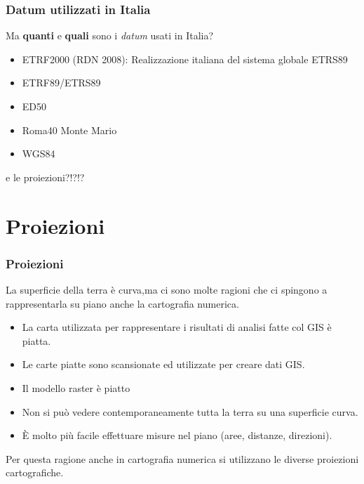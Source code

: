 \documentclass{beamer}
\begin{document}
{\begin{frame}
\end{frame}

\begin{frame}
\frametitle{Datum utilizzati in Italia}

Ma \textbf{quanti} e \textbf{quali} sono i \textit{datum} usati in Italia?

\begin{itemize}
	\item ETRF2000 (RDN 2008): Realizzazione italiana del sistema globale ETRS89
	\item ETRF89/ETRS89	
	\item ED50	 
	\item Roma40 Monte Mario
	\item WGS84
\end{itemize}

\begin{center}
e le proiezioni?!?!?
\end{center}
\end{frame}

\section{Proiezioni}

\begin{frame}
   \frametitle{Proiezioni}
	La superficie della terra è curva,ma ci sono molte ragioni che ci spingono a
    rappresentarla su piano anche la cartografia numerica.
	\begin{itemize}
		\item La carta utilizzata per rappresentare i risultati di analisi fatte col GIS è piatta.
		\item Le carte piatte sono scansionate ed utilizzate per creare dati GIS.
		\item Il modello raster è piatto
		\item Non si può vedere contemporaneamente tutta la terra su una superficie curva.
		\item È molto più facile effettuare misure nel piano (aree, distanze, direzioni).
	\end{itemize}
	Per questa ragione anche in cartografia numerica si utilizzano le diverse proiezioni cartografiche.
\end{frame}

}
\end{document}
